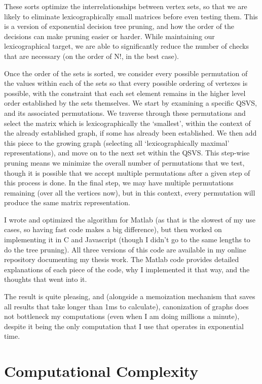 These sorts optimize the interrelationships between vertex sets, so that we are likely to eliminate lexicographically small matrices before even testing them.
This is a version of exponential decision tree pruning, and how the order of the decisions can make pruning easier or harder.
While maintaining our lexicographical target, we are able to significantly reduce the number of checks that are necessary (on the order of N!, in the best case).

Once the order of the sets is sorted, we consider every possible permutation of the values within each of the sets so that every possible ordering of vertexes is possible, with the constraint that each set element remains in the higher level order established by the sets themselves.
We start by examining a specific QSVS, and its associated permutations.
We traverse through these permutations and select the matrix which is lexicographically the `smallest', within the context of the already established graph, if some has already been established.
We then add this piece to the growing graph (selecting all `lexicographically maximal' representations), and move on to the next set within the QSVS.
This step-wise pruning means we minimize the overall number of permutations that we test, though it is possible that we accept multiple permutations after a given step of this process is done.
In the final step, we may have multiple permutations remaining (over all the vertices now), but in this context, every permutation will produce the same matrix representation.

I wrote and optimized the algorithm for Matlab (as that is the slowest of my use cases, so having fast code makes a big difference), but then worked on implementing it in C and Javascript (though I didn't go to the same lengths to do the tree pruning).
All three versions of this code are available in my online repository documenting my thesis work.
The Matlab code provides detailed explanations of each piece of the code, why I implemented it that way, and the thoughts that went into it.

The result is quite pleasing, and (alongside a memoization mechanism that saves all results that take longer than 1ms to calculate), canonization of graphs does not bottleneck my computations (even when I am doing millions a minute), despite it being the only computation that I use that operates in exponential time.

\section{Computational Complexity}

